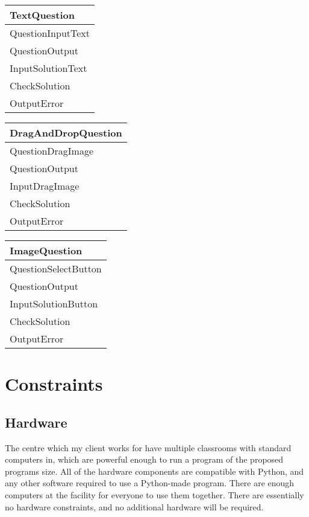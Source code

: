 \begin{center}
\begin{tabular}{|p{5cm}|} \hline
TextQuestion \\ \hline
QuestionInputText \\ 
QuestionOutput \\ \hline
InputSolutionText \\ 
CheckSolution \\
OutputError \\ \hline
\end{tabular}
\end{center}

\begin{center}
\begin{tabular}{|p{5cm}|} \hline
DragAndDropQuestion \\ \hline
QuestionDragImage \\ 
QuestionOutput \\ \hline
InputDragImage \\ 
CheckSolution \\
OutputError \\ \hline
\end{tabular}
\end{center}

\begin{center}
\begin{tabular}{|p{5cm}|} \hline
ImageQuestion \\ \hline
QuestionSelectButton \\ 
QuestionOutput \\ \hline
InputSolutionButton \\ 
CheckSolution \\
OutputError \\ \hline
\end{tabular}
\end{center}

\section{Constraints}

\subsection{Hardware}

The centre which my client works for have multiple classrooms with standard computers in, which are powerful enough to run a program of the proposed programs size. All of the hardware components are compatible with Python, and any other software required to use a Python-made program. There are enough computers at the facility for everyone to use them together. There are essentially no hardware constraints, and no additional hardware will be required.

